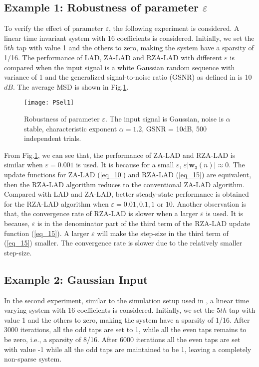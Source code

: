\documentclass[conference]{IEEEtran}
\begin{document}
\subsection {Example 1: Robustness of parameter $\varepsilon$}
\label{S4-1}
To verify the effect of parameter $\varepsilon$, the following experiment is considered.  A linear time invariant system with 16 coefficients is considered. Initially, we set the $5th$ tap with value 1 and the others to zero, making the system have a sparsity of 1/16. The performance of LAD, ZA-LAD and RZA-LAD with different  $\varepsilon$  is compared when the input signal is a white Gaussian random sequence with variance
of 1 and the generalized signal-to-noise ratio (GSNR) as defined in \cite{refgsnr} is 10 $dB$. The average MSD is shown in Fig.\ref{fig1_r}. 
\begin{figure}[!ht]
\centering
\texttt{[image: PSel1]}
\caption{Robustness of parameter $\varepsilon$. The input signal is Gaussian, noise is $\alpha$  stable, characteristic exponent  $\alpha  = 1.2$, GSNR = 10dB, 500 independent trials.}
\label{fig1_r}
\end{figure}

From Fig.\ref{fig1_r}, we can see that, the performance of ZA-LAD and RZA-LAD is similar when $\varepsilon=0.001$ is used. It is because for a small $\varepsilon$, $\varepsilon \left|\mathbf{w}_3(n) \right| \approx 0$. The update functions for ZA-LAD (\ref{eq_10}) and RZA-LAD  (\ref{eq_15})  are equivalent, then the RZA-LAD algorithm reduces to the conventional ZA-LAD algorithm.
Compared with LAD and ZA-LAD, better steady-state performance is obtained for the RZA-LAD algorithm  when $\varepsilon=0.01, 0.1, 1$ or $10$. Another observation is that, the  convergence rate of RZA-LAD is slower when a larger $\varepsilon$ is used. It is because, $\varepsilon$ is in the denominator part of the third term of the RZA-LAD update function (\ref{eq_15}). A larger $\varepsilon$ will make the step-size in the third term of (\ref{eq_15}) smaller. The convergence rate is slower due to the relatively smaller step-size. 
\subsection {Example 2: Gaussian Input}
\label{S4-2}
In the second experiment, similar to the simulation setup used in \cite{ref25}, a linear time varying system with 16 coefficients is considered. Initially, we set the $5th$ tap with value 1 and the others to zero, making the system have a sparsity of 1/16. After 3000 iterations, all the odd taps are set to 1, while all the even taps remains
to be zero, i.e., a sparsity of 8/16. After 6000 iterations all the even taps are set with value -1 while all the odd taps are maintained to be
1, leaving a completely non-sparse system. 
\end{document}
